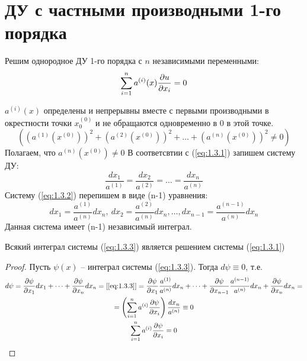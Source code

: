 \documentclass[../main.tex]{subfiles}
\begin{document}
\section{ДУ с частными производными 1-го порядка}
Решим однородное ДУ 1-го порядка с $n$ независимыми переменными:
\begin{equation}
	\label{eq:1.3.1}
	\sum_{i=1}^n a^{(i)}(x)\frac{\partial u}{\partial x_i} = 0
\end{equation}

$a^{(i)}(x)$ определены и непрерывны вместе с первыми производными в
окрестности точки $x_0^{(0)}$ и не обращаются одновременно в $0$ в этой точке.
\[
	\left((a^{(1)}(x^{(0)}))^2 + (a^{(2)}(x^{(0)}))^2 + \dots + (a^{(n)}(x^{(0)}))^2 \neq 0\right)
\]
Полагаем, что $a^{(n)}(x^{(0)})\neq 0$
В соответсвтии с (\ref*{eq:1.3.1}) запишем систему ДУ:
\begin{equation}
	\label{eq:1.3.2}
	\frac{dx_1}{a^{(1)}} = \frac{dx_2}{a^{(2)}} = \dots = \frac{dx_n}{a^{(n)}}
\end{equation}
Систему (\ref*{eq:1.3.2}) перепишем в виде (n-1) уравнения:
\begin{equation}
	\label{eq:1.3.3}
	dx_1 = \frac{a^{(1)}}{a^{(n)}}dx_n, \:
	dx_2 = \frac{a^{(2)}}{a^{(n)}}dx_n,
	\dots,
	dx_{n-1} = \frac{a^{(n-1)}}{a^{(n)}}dx_n
\end{equation}
Данная система имеет (n-1) независимый интеграл.
\begin{theorem}
	Всякий интеграл системы (\ref*{eq:1.3.3}) является решением системы (\ref*{eq:1.3.1})
\end{theorem}
\begin{proof}
	Пусть $\psi(x)$ -- интеграл системы (\ref*{eq:1.3.3}). Тогда $d\psi \equiv 0$,
	т.е.
	\begin{gather*}
		d\psi = \pderiv{\psi}{x_1}dx_1 + \dots + \pderiv{\psi}{x_n}dx_n = [\ref*{eq:1.3.3}] =
		\pderiv{\psi}{x_1}\frac{a^{(1)}}{a^{(n)}}dx_n + \dots
		+ \pderiv{\psi}{x_{n-1}}\frac{a^{(n-1)}}{a^{(n)}}dx_n + \pderiv{\psi}{x_n}dx_n = \\
		= \left(\sum_{i=1}^{n}a^{(i)}\pderiv{\psi}{x_i}\right)\frac{dx_n}{a^{(n)}} \equiv 0\\
		\sum_{i=1}^{n}a^{(i)}\pderiv{\psi}{x_i} = 0
	\end{gather*}
\end{proof}
\end{document}

